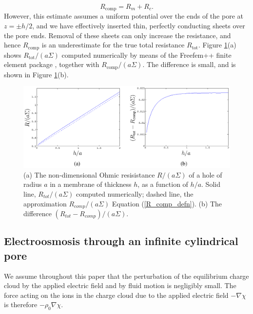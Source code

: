 \begin{equation}
R_\text{comp}=R_m+R_c.
\label{R_comp_defn}
\end{equation}
However, this estimate assumes a uniform potential over the ends of the pore at $z=\pm h/2$, and we have effectively inserted thin, perfectly conducting sheets over the pore ends. Removal of these sheets can only increase the resistance, and hence $R_\text{comp}$ is an underestimate for the true total resistance $R_\text{tot}$. Figure \ref{Fig:Rcomp}(a) shows $R_\text{tot}/(a\Sigma)$ computed numerically by means of the Freefem++ finite element package \cite{hecht2012}, together with $R_\text{comp}/(a\Sigma)$. The difference is small, and is shown in Figure \ref{Fig:Rcomp}(b).

\begin{figure}[ht]
\begin{center}
\includegraphics[width=\textwidth]{finite_thickness/finite_pore_pic6.eps}
\end{center}
\caption{(a) The non-dimensional Ohmic resisistance $R/(a\Sigma)$ of a hole of radius $a$ in a membrane of thickness $h$, as a function of
$h/a$. Solid line, $R_{tot}/(a\Sigma)$ computed numerically; dashed line, the approximation $R_{comp}/(a\Sigma)$ Equation (\ref{R_comp_defn}). (b) The difference $(R_{tot}-R_{comp})/(a\Sigma)$.}
\label{Fig:Rcomp}
\end{figure}

\subsection{Electroosmosis through an infinite cylindrical pore}
We assume throughout this paper that the perturbation of the equilibrium charge cloud by the applied electric field and by fluid motion is negligibly small. The force acting on the ions in the charge cloud due to the applied electric field $-\nabla\chi$ is therefore $-\rho_0\nabla\chi$.

